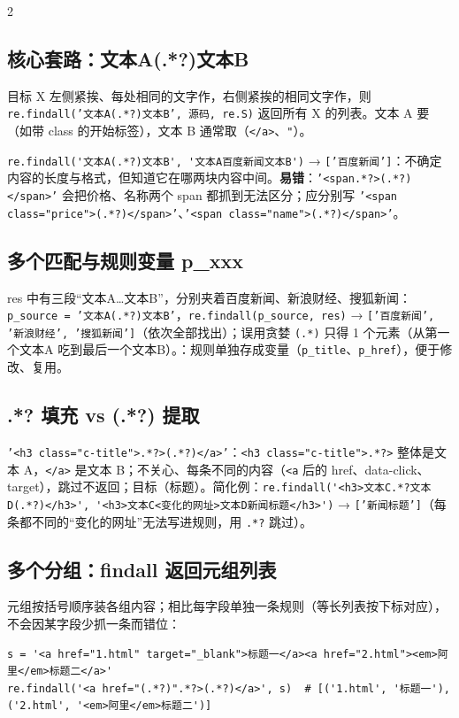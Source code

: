 \begin{multicols}{2}\raggedcolumns\sloppy
\subsection{核心套路：文本A(.*?)文本B}\label{sec:D06-AB}
\begin{thm}
目标 X 左侧紧挨、每处相同的文字作，右侧紧挨的相同文字作，则 \texttt{re.findall('文本A(.*?)文本B', 源码, re.S)} 返回所有 X 的列表。文本 A 要（如带 class 的开始标签），文本 B 通常取（\texttt{</a>}、\texttt{"}）。
\end{thm}
\lstinline|re.findall('文本A(.*?)文本B', '文本A百度新闻文本B')| → \texttt{['百度新闻']}：不确定内容的长度与格式，但知道它在哪两块内容中间。\textbf{易错}：\texttt{'<span.*?>(.*?)</span>'} 会把价格、名称两个 span 都抓到无法区分；应分别写 \texttt{'<span class="price">(.*?)</span>'}、\texttt{'<span class="name">(.*?)</span>'}。

\subsection{多个匹配与规则变量 p\_xxx}
res 中有三段“文本A…文本B”，分别夹着百度新闻、新浪财经、搜狐新闻：\texttt{p\_source = '文本A(.*?)文本B'}，\texttt{re.findall(p\_source, res)} → \texttt{['百度新闻', '新浪财经', '搜狐新闻']}（依次全部找出）；误用贪婪 \texttt{(.*)} 只得 1 个元素（从第一个文本A 吃到最后一个文本B）。：规则单独存成变量（\texttt{p\_title}、\texttt{p\_href}），便于修改、复用。

\subsection{.*? 填充 vs (.*?) 提取}
\texttt{'<h3 class="c-title">.*?>(.*?)</a>'}：\texttt{<h3 class="c-title">.*?>} 整体是文本 A，\texttt{</a>} 是文本 B；不关心、每条不同的内容（\texttt{<a} 后的 href、data-click、target），跳过不返回；目标（标题）。简化例：\lstinline|re.findall('<h3>文本C.*?文本D(.*?)</h3>', '<h3>文本C<变化的网址>文本D新闻标题</h3>')| → \texttt{['新闻标题']}（每条都不同的“变化的网址”无法写进规则，用 \texttt{.*?} 跳过）。
\end{multicols}

\subsection{多个分组：findall 返回元组列表 \texorpdfstring{\tagext}{（拓展）}}\label{sec:D06-tuple}
元组按括号顺序装各组内容；相比每字段单独一条规则（等长列表按下标对应），不会因某字段少抓一条而错位：
\begin{lstlisting}[style=pyD06]
s = '<a href="1.html" target="_blank">标题一</a><a href="2.html"><em>阿里</em>标题二</a>'
re.findall('<a href="(.*?)".*?>(.*?)</a>', s)  # [('1.html', '标题一'), ('2.html', '<em>阿里</em>标题二')]
\end{lstlisting}


